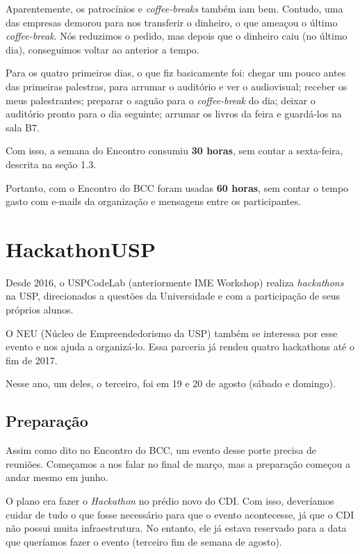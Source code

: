 \documentclass[12pt,letterpaper]{article}
\begin{document}
	Aparentemente, os patrocínios e \textit{coffee-breaks} também iam bem. Contudo, uma das empresas demorou para nos transferir o dinheiro, o que ameaçou o último \textit{coffee-break}. Nós reduzimos o pedido, mas depois que o dinheiro caiu (no último dia), conseguimos voltar ao anterior a tempo.
	
	Para os quatro primeiros dias, o que fiz basicamente foi: chegar um pouco antes das primeiras palestras, para arrumar o auditório e ver o audiovisual; receber os meus palestrantes; preparar o saguão para o \textit{coffee-break} do dia; deixar o auditório pronto para o dia seguinte; arrumar os livros da feira e guardá-los na sala B7.
	
	Com isso, a semana do Encontro consumiu \textbf{30 horas}, sem contar a sexta-feira, descrita na seção 1.3.
	
	Portanto, com o Encontro do BCC foram usadas \textbf{60 horas}, sem contar o tempo gasto com e-mails da organização e mensagens entre os participantes.
	
	\section{HackathonUSP}
	
	Desde 2016, o USPCodeLab (anteriormente IME Workshop) realiza \textit{hackathons} na USP, direcionados a questões da Universidade e com a participação de seus próprios alunos.
	
	O NEU (Núcleo de Empreendedorismo da USP) também se interessa por esse evento e nos ajuda a organizá-lo. Essa parceria já rendeu quatro hackathons até o fim de 2017.
	
	Nesse ano, um deles, o terceiro, foi em 19 e 20 de agosto (sábado e domingo).
	
	\subsection{Preparação}
	
	Assim como dito no Encontro do BCC, um evento desse porte precisa de reuniões. Começamos a nos falar no final de março, mas a preparação começou a andar mesmo em junho.
	
	O plano era fazer o \textit{Hackathon} no prédio novo do CDI. Com isso, deveríamos cuidar de tudo o que fosse necessário para que o evento acontecesse, já que o CDI não possui muita infraestrutura. No entanto, ele já estava reservado para a data que queríamos fazer o evento (terceiro fim de semana de agosto).
	
\end{document}

